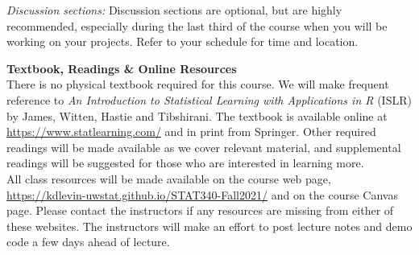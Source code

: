 \documentclass[11pt,oneside]{amsart}
\newcommand{\header}[1]{\bigbreak\textbf{#1}}
\begin{document}
{\em Discussion sections:} Discussion sections are optional, but are highly recommended, especially during the last third of the course when you will be working on your projects. Refer to your schedule for time and location.

\header{Textbook, Readings \& Online Resources}\\
There is no physical textbook required for this course.
We will make frequent reference to
{\em An Introduction to Statistical Learning with Applications in R} (ISLR) by James, Witten, Hastie and Tibshirani.
The textbook is available online at \url{https://www.statlearning.com/} and in print from Springer.
Other required readings will be made available as we cover relevant material, and supplemental readings will be suggested for those who are interested in learning more.\\

All class resources will be made available on the course web page,
\url{https://kdlevin-uwstat.github.io/STAT340-Fall2021/}
and on the course Canvas page.
Please contact the instructors if any resources are missing from either of these websites.
The instructors will make an effort to post lecture notes and demo code a few days ahead of lecture.

%
%
\end{document}
